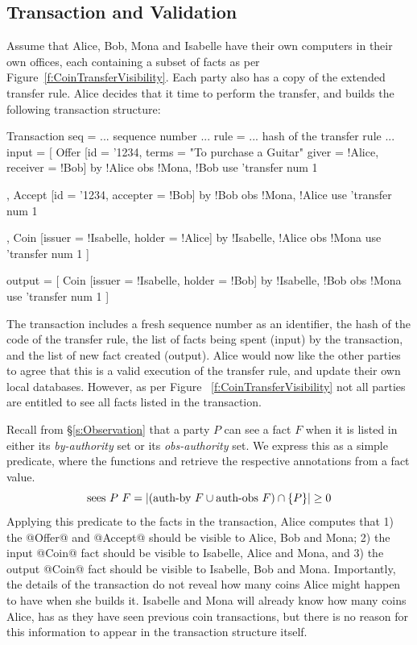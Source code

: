 \subsection{Transaction and Validation}
\label{s:Transactions}
Assume that Alice, Bob, Mona and Isabelle have their own computers in their own offices, each containing a subset of facts as per Figure~\ref{f:CoinTransferVisibility}. Each party also has a copy of the extended transfer rule. Alice decides that it time to perform the transfer, and builds the following transaction structure:

\begin{small}
\begin{code}
Transaction
 seq    = ... sequence number ...
 rule   = ... hash of the transfer rule ...
 input  = [ Offer [id = '1234, terms = "To purchase a Guitar"
                  giver = !Alice, receiver = !Bob]
            by  {!Alice}            obs {!Mona, !Bob}
            use {'transfer}         num  1

          , Accept [id = '1234, accepter = !Bob]
            by  {!Bob}              obs {!Mona, !Alice}
            use {'transfer}         num 1

          , Coin   [issuer = !Isabelle, holder = !Alice]
            by  {!Isabelle, !Alice} obs {!Mona}
            use {'transfer}         num 1 ]

 output = [ Coin   [issuer = !Isabelle, holder = !Bob]
            by  {!Isabelle, !Bob}   obs {!Mona}
            use {'transfer}         num 1 ]
\end{code}
\end{small}

The transaction includes a fresh sequence number as an identifier, the hash of the code of the transfer rule, the list of facts being spent (input) by the transaction, and the list of new fact created (output). Alice would now like the other parties to agree that this is a valid execution of the transfer rule, and update their own local databases. However, as per Figure ~\ref{f:CoinTransferVisibility} not all parties are entitled to see all facts listed in the transaction.

Recall from \S\ref{s:Observation} that a party $P$ can see a fact $F$ when it is listed in either its \emph{by-authority} set or its \emph{obs-authority} set. We express this as a simple predicate, where the functions  and  retrieve the respective annotations from a fact value.
$$
\textrm{sees}~ P~ F = |(\textrm{auth-by}~F \cup \textrm{auth-obs}~F) \cap \{P\}| \ge 0
$$
Applying this predicate to the facts in the transaction, Alice computes that 1) the @Offer@ and @Accept@ should be visible to Alice, Bob and Mona; 2) the input @Coin@ fact should be visible to Isabelle, Alice and Mona, and 3) the output @Coin@ fact should be visible to Isabelle, Bob and Mona. Importantly, the details of the transaction do not reveal how many coins Alice might happen to have when she builds it. Isabelle and Mona will already know how many coins Alice, has as they have seen previous coin transactions, but there is no reason for this information to appear in the transaction structure itself.

